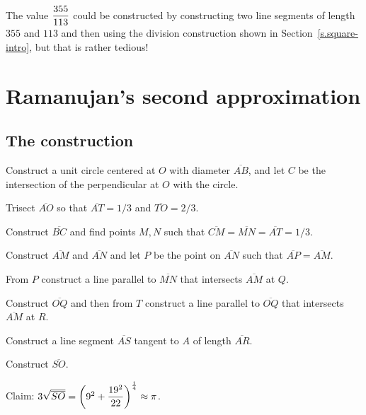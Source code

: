 \bigskip

The value $\displaystyle\frac{355}{113}$ could be constructed by constructing two line segments of length $355$ and $113$ and then using the division construction shown in Section~\ref{s.square-intro}, but that is rather tedious!

\newpage


\section{Ramanujan's second approximation}

\subsection{The construction}

Construct a unit circle centered at $O$ with diameter $\overline{AB}$, and let $C$ be the intersection of the perpendicular at $O$ with the circle.

Trisect $\overline{AO}$ so that $\overline{AT}=1/3$ and $\overline{TO}=2/3$.

Construct $\overline{BC}$ and find points $M,N$ such that $\overline{CM}=\overline{MN}=\overline{AT}=1/3$.

Construct $\overline{AM}$ and $\overline{AN}$ and let $P$ be the point on $\overline{AN}$ such that $\overline{AP}=\overline{AM}$.

From $P$ construct a line parallel to $\overline{MN}$ that intersects $\overline{AM}$ at $Q$.

Construct $\overline{OQ}$ and then from $T$ construct a line parallel to $\overline{OQ}$ that intersects $\overline{AM}$ at $R$.

Construct a line segment $\overline{AS}$ tangent to $A$ of length $\overline{AR}$.

Construct $\overline{SO}$.

Claim: $3\sqrt{\overline{SO}}=\left(9^2+\displaystyle\frac{19^2}{22}\right)^{\frac{1}{4}}\approx \pi$.

